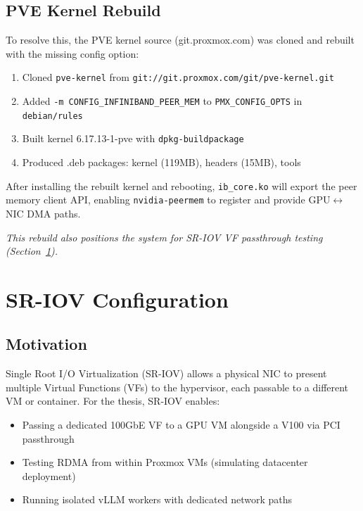 \documentclass[10pt,letterpaper]{article}
\begin{document}
\subsection{PVE Kernel Rebuild}

To resolve this, the PVE kernel source (git.proxmox.com) was cloned and rebuilt with the missing config option:

\begin{enumerate}[noitemsep]
    \item Cloned \texttt{pve-kernel} from \texttt{git://git.proxmox.com/git/pve-kernel.git}
    \item Added \texttt{-m CONFIG\_INFINIBAND\_PEER\_MEM} to \texttt{PMX\_CONFIG\_OPTS} in \texttt{debian/rules}
    \item Built kernel 6.17.13-1-pve with \texttt{dpkg-buildpackage}
    \item Produced .deb packages: kernel (119MB), headers (15MB), tools
\end{enumerate}

After installing the rebuilt kernel and rebooting, \texttt{ib\_core.ko} will export the peer memory client API, enabling \texttt{nvidia-peermem} to register and provide GPU$\leftrightarrow$NIC DMA paths.

\textit{This rebuild also positions the system for SR-IOV VF passthrough testing (Section~\ref{sec:sriov}).}

\section{SR-IOV Configuration}
\label{sec:sriov}

\subsection{Motivation}

Single Root I/O Virtualization (SR-IOV) allows a physical NIC to present multiple Virtual Functions (VFs) to the hypervisor, each passable to a different VM or container. For the thesis, SR-IOV enables:

\begin{itemize}[noitemsep]
    \item Passing a dedicated 100GbE VF to a GPU VM alongside a V100 via PCI passthrough
    \item Testing RDMA from within Proxmox VMs (simulating datacenter deployment)
    \item Running isolated vLLM workers with dedicated network paths
\end{itemize}
\end{document}
